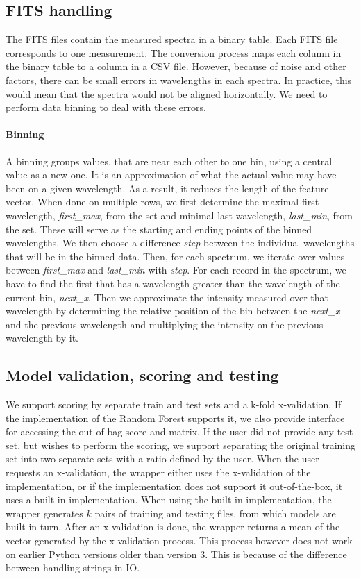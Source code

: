\documentclass[thesis=B,english]{FITthesis}[2012/10/20]
\begin{document}
\subsection{FITS handling}
The FITS files contain the measured spectra in a binary table. Each FITS file corresponds to one measurement. The conversion process maps each column in the binary table to a column in a CSV file. However, because of noise and other factors, there can be small errors in wavelengths in each spectra. In practice, this would mean that the spectra would not be aligned horizontally. We need to perform data binning to deal with these errors. 

\paragraph*{Binning}
\label{sec:binning} 
A binning groups values, that are near each other to one bin, using a central value as a new one. It is an approximation of what the actual value may have been on a given wavelength. As a result, it reduces the length of the feature vector. When done on multiple rows, we first determine the maximal first wavelength, \textit{first\_max}, from the set and minimal last wavelength, \textit{last\_min}, from the set. These will serve as the starting and ending points of the binned wavelengths. We then choose a difference \textit{step} between the individual wavelengths that will be in the binned data. Then, for each spectrum, we iterate over values between \textit{first\_max} and \textit{last\_min} with \textit{step}. For each record in the spectrum, we have to find the first that has a wavelength greater than the wavelength of the current bin, \textit{next\_x}. Then we approximate the intensity measured over that wavelength by determining the relative position of the bin between the \textit{next\_x} and the previous wavelength and multiplying the intensity on the previous wavelength by it. 

\subsection{Model validation, scoring and testing}
\label{sub:wrapper_test}
We support scoring by separate train and test sets and a k-fold x-validation. If the implementation of the Random Forest supports it, we also provide interface for accessing the out-of-bag score and matrix. If the user did not provide any test set, but wishes to perform the scoring, we support separating the original training set into two separate sets with a ratio defined by the user. When the user requests an x-validation, the wrapper either uses the x-validation of the implementation, or if the implementation does not support it out-of-the-box, it uses a built-in implementation. When using the built-in implementation, the wrapper generates \(k\) pairs of training and testing files, from which models are built in turn. After an x-validation is done, the wrapper returns a mean of the vector generated by the x-validation process. This process however does not work on earlier Python versions older than version 3. This is because of the difference between handling strings in IO.  
\end{document}
